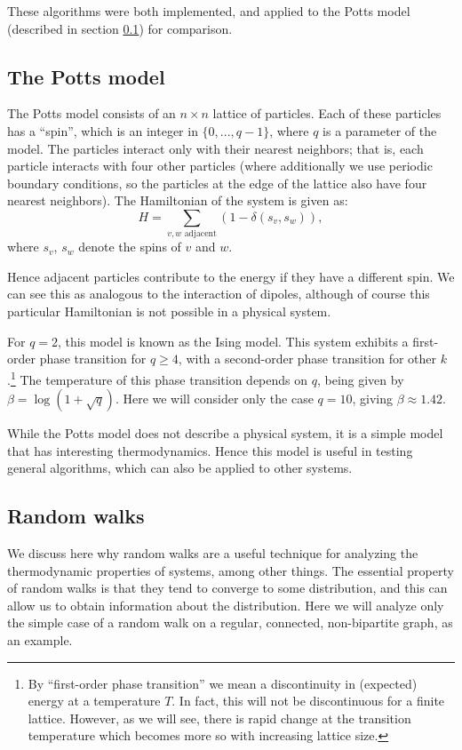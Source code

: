 \documentclass{article}
\begin{document}
These algorithms were both implemented, and applied to the Potts model (described in section \ref{sec:potts_model}) for comparison.

\subsection{The Potts model}
\label{sec:potts_model}
The Potts model consists of an $n\times n$ lattice of particles.
Each of these particles has a ``spin'', which is an integer in $\{0,...,q-1\}$, where $q$ is a parameter of the model.
The particles interact only with their nearest neighbors; that is, each particle interacts with four other particles (where additionally we use periodic boundary conditions, so the particles at the edge of the lattice also have four nearest neighbors).
The Hamiltonian of the system is given as:
$$ H = \sum_{v, w \text{ adjacent}}(1-\delta(s_v, s_w)), $$
where $s_v$, $s_w$ denote the spins of $v$ and $w$.

Hence adjacent particles contribute to the energy if they have a different spin.
We can see this as analogous to the interaction of dipoles, although of course this particular Hamiltonian is not possible in a physical system.

For $q = 2$, this model is known as the Ising model.
This system exhibits a first-order phase transition for $q \geq 4$, with a second-order phase transition for other $k$.\cite{Janke}\footnote{By ``first-order phase transition'' we mean a discontinuity in (expected) energy at a temperature $T$. In fact, this will not be discontinuous for a finite lattice. However, as we will see, there is rapid change at the transition temperature which becomes more so with increasing lattice size.}
The temperature of this phase transition depends on $q$, being given by $\beta = \log(1+\sqrt q)$.\cite{Janke}
Here we will consider only the case $q = 10$, giving $\beta \approx 1.42$.

While the Potts model does not describe a physical system, it is a simple model that has interesting thermodynamics.
Hence this model is useful in testing general algorithms, which can also be applied to other systems.

\subsection{Random walks}
We discuss here why random walks are a useful technique for analyzing the thermodynamic properties of systems, among other things.
The essential property of random walks is that they tend to converge to some distribution, and this can allow us to obtain information about the distribution.
Here we will analyze only the simple case of a random walk on a regular, connected, non-bipartite graph, as an example.
\end{document}
